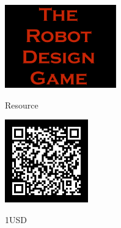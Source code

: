 \documentclass[11pt]{article}
\begin{document}
\color{white}            
    
    \begin{center}
        \vfill
        \vfill
        \vfill

        \includegraphics[height=3.6cm]{rdg_logo}%
        
        \vfill

        

Resource



        \includegraphics[height=3.6cm]{1USD-qr}%

        1USD

        \vfill
    \end{center}
\end{document}
